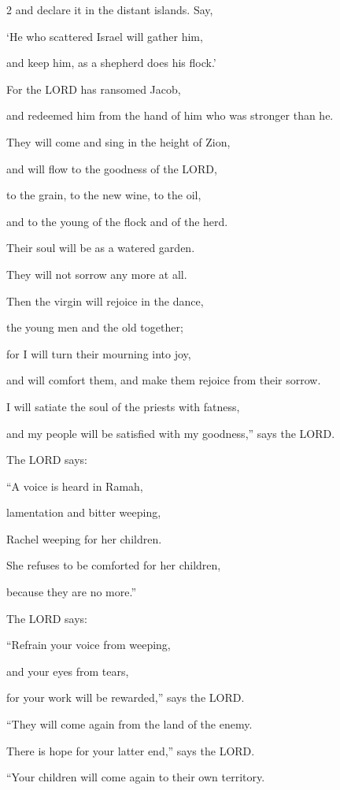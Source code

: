 \begin{multicols}{2}
and declare it in the distant islands. Say,

‘He who scattered Israel will gather him,

and keep him, as a shepherd does his flock.’


\myverse{}For the LORD has ransomed Jacob,

and redeemed him from the hand of him who was stronger than he.


\myverse{}They will come and sing in the height of Zion,

and will flow to the goodness of the LORD,

to the grain, to the new wine, to the oil,

and to the young of the flock and of the herd.

Their soul will be as a watered garden.

They will not sorrow any more at all.


\myverse{}Then the virgin will rejoice in the dance,

the young men and the old together;

for I will turn their mourning into joy,

and will comfort them, and make them rejoice from their sorrow.


\myverse{}I will satiate the soul of the priests with fatness,

and my people will be satisfied with my goodness,” says the LORD.

\vspace{\baselineskip}

\myverse{}The LORD says:

“A voice is heard in Ramah,

lamentation and bitter weeping,

Rachel weeping for her children.

She refuses to be comforted for her children,

because they are no more.”


\myverse{}The LORD says:

“Refrain your voice from weeping,

and your eyes from tears,

for your work will be rewarded,” says the LORD.

“They will come again from the land of the enemy.


\myverse{}There is hope for your latter end,” says the LORD.

“Your children will come again to their own territory.


\end{multicols}
